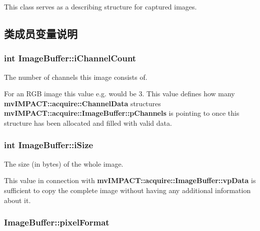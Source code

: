 This class serves as a describing structure for captured images. 

\subsection{类成员变量说明}
\hypertarget{struct_image_buffer_aff3523b865533ee79471454201a5350c}{
\subsubsection[{i\+Channel\+Count}]{\setlength{\rightskip}{0pt plus 5cm}int Image\+Buffer\+::i\+Channel\+Count}}\label{struct_image_buffer_aff3523b865533ee79471454201a5350c}


The number of channels this image consists of. 

For an R\+G\+B image this value e.\+g. would be 3. This value defines how many {\bfseries mv\+I\+M\+P\+A\+C\+T\+::acquire\+::\+Channel\+Data} structures {\bfseries mv\+I\+M\+P\+A\+C\+T\+::acquire\+::\+Image\+Buffer\+::p\+Channels} is pointing to once this structure has been allocated and filled with valid data. \hypertarget{struct_image_buffer_a694d3c3df58d29da2b9741498566f352}{
\subsubsection[{i\+Size}]{\setlength{\rightskip}{0pt plus 5cm}int Image\+Buffer\+::i\+Size}}\label{struct_image_buffer_a694d3c3df58d29da2b9741498566f352}


The size (in bytes) of the whole image. 

This value in connection with {\bfseries mv\+I\+M\+P\+A\+C\+T\+::acquire\+::\+Image\+Buffer\+::vp\+Data} is sufficient to copy the complete image without having any additional information about it. \hypertarget{struct_image_buffer_a18c13011f02db49b05f5f34af314e1b2}{
\subsubsection[{pixel\+Format}]{ Image\+Buffer\+::pixel\+Format}}\label{struct_image_buffer_a18c13011f02db49b05f5f34af314e1b2}


